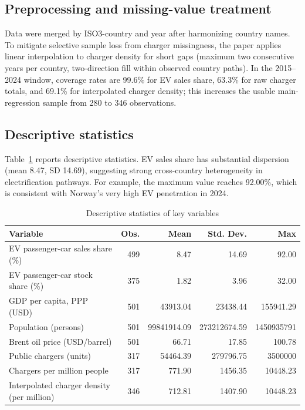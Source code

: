 \documentclass[a4paper,12pt]{article}
\begin{document}
\subsection{Preprocessing and missing-value treatment}
Data were merged by ISO3-country and year after harmonizing country names. To mitigate selective sample loss from charger missingness, the paper applies linear interpolation to charger density for short gaps (maximum two consecutive years per country, two-direction fill within observed country paths). In the 2015--2024 window, coverage rates are 99.6\% for EV sales share, 63.3\% for raw charger totals, and 69.1\% for interpolated charger density; this increases the usable main-regression sample from 280 to 346 observations.

\subsection{Descriptive statistics}
Table~\ref{tab:desc} reports descriptive statistics. EV sales share has substantial dispersion (mean 8.47, SD 14.69), suggesting strong cross-country heterogeneity in electrification pathways. For example, the maximum value reaches 92.00\%, which is consistent with Norway's very high EV penetration in 2024.

\begin{table}[H]
\centering
\caption{Descriptive statistics of key variables}
\label{tab:desc}
\begin{tabular}{lrrrr}
\toprule
Variable & Obs. & Mean & Std. Dev. & Max \\
\midrule
EV passenger-car sales share (\%) & 499 & 8.47 & 14.69 & 92.00 \\
EV passenger-car stock share (\%) & 375 & 1.82 & 3.96 & 32.00 \\
GDP per capita, PPP (USD) & 501 & 43913.04 & 23438.44 & 155941.29 \\
Population (persons) & 501 & 99841914.09 & 273212674.59 & 1450935791 \\
Brent oil price (USD/barrel) & 501 & 66.71 & 17.85 & 100.78 \\
Public chargers (units) & 317 & 54464.39 & 279796.75 & 3500000 \\
Chargers per million people & 317 & 771.90 & 1456.35 & 10448.23 \\
Interpolated charger density (per million) & 346 & 712.81 & 1407.90 & 10448.23 \\
\bottomrule
\end{tabular}
\end{table}
\end{document}
